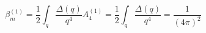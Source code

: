 \begin{equation}
\beta_m^{(1)} = \frac{1}{2} \int_q \frac{\Delta (q)}{q^4} A_4^{(1)} =
\frac{1}{2} \int_q \frac{\Delta (q)}{q^4} = \frac{1}{(4\pi)^2}
\label{betamfirst} 
\end{equation}

